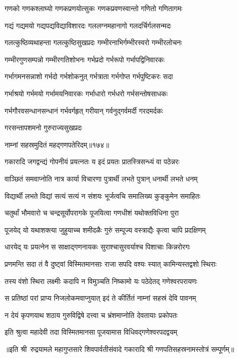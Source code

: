 \twolineshloka
{गणको गणकश्लाघ्यो गणकप्रणयोत्सुकः}%
{गणकप्रवणस्वान्तो गणितो गणितागमः}%

\twolineshloka
{गद्यं गद्यमयो गद्यपद्यविद्याविशारदः}%
{गललग्नमहानागो गलदर्चिर्गलसन्मदः}%

\twolineshloka
{गलत्कुष्ठिव्यथाहन्ता गलत्कुष्ठिसुखप्रदः}%
{गम्भीरनाभिर्गम्भीरस्वरो गम्भीरलोचनः}%

\twolineshloka
{गम्भीरगुणसम्पन्नो गम्भीरगतिशोभनः}%
{गर्भप्रदो गर्भरूपो गर्भापद्विनिवारकः}%

\twolineshloka
{गर्भागमनसन्नाशो गर्भदो गर्भशोकनुत्}%
{गर्भत्राता गर्भगोप्त गर्भपुष्टिकरः सदा}%

\twolineshloka
{गर्भाश्रयो गर्भमयो गर्भामयनिवारकः}%
{गर्भाधारो गर्भधरो गर्भसन्तोषसाधकः}%

\twolineshloka
{गर्भगौरवसन्धानसन्धानं गर्भवर्गहृत्}%
{गरीयान् गर्वनुद्गर्वमर्दी गरदमर्दकः}%

{गरसन्तापशमनो गुरुराज्यसुखप्रदः}%

{नाम्नां सहस्रमुदितं महद्गणपतेरिदम्॥१७४॥}%
\addtocounter{shlokacount}{1}

\twolineshloka
{गकारादि जगद्वन्द्यं गोपनीयं प्रयत्नतः}%
{य इदं प्रयतः प्रातस्त्रिसन्ध्यं वा पठेन्नरः}%

\twolineshloka
{वाञ्छितं समवाप्नोति नात्र कार्या विचारणा}%
{पुत्रार्थी लभते पुत्रान् धनार्थी लभते धनम्}%

\twolineshloka
{विद्यार्थी लभते विद्यां सत्यं सत्यं न संशयः}%
{भूर्जत्वचि समालिख्य कुङ्कुमेन समाहितः}%

\twolineshloka
{चतुर्थां भौमवारो च चन्द्रसूर्योपरागके}%
{पूजयित्वा गणधीशं यथोक्तविधिना पुरा}%

\twolineshloka
{पूजयेद् यो यथाशक्त्या जुहुयाच्च शमीदळैः}%
{गुरुं सम्पूज्य वस्त्राद्यैः कृत्वा चापि प्रदक्षिणम्}%

\twolineshloka
{धारयेद् यः प्रयत्नेन स साक्षाद्गणनायकः}%
{सुराश्चासुरवर्याश्च पिशाचाः किन्नरोरगः}%

\twolineshloka
{प्रणमन्ति सदा तं वै दुष्ट्वां विस्मितमानसाः}%
{राजा सपदि वश्यः स्यात् कामिन्यस्तद्वशो स्थिराः}%

\twolineshloka
{तस्य वंशो स्थिरा लक्ष्मीः कदापि न विमुञ्चति}%
{निष्कामो यः पठेदेतद् गणेश्वरपरायणः}%

\twolineshloka
{स प्रतिष्ठां परां प्राप्य निजलोकमवाप्नुयात्}%
{इदं ते कीर्तितं नाम्नां सहस्रं देवि पावनम्}%

\twolineshloka
{न देयं कृपणयाथ शठाय गुरुविद्विषे}%
{दत्त्वा च भ्रंशमाप्नोति देवतायाः प्रकोपतः}%

\twolineshloka
{इति श्रुत्वा महादेवी तदा विस्मितमानसा}%
{पूजयामास विधिवद्गणेश्वरपदद्वयम्}%

॥इति श्री~रुद्रयामले महागुप्तसारे शिवपार्वतीसंवादे गकारादि श्री गणपतिसहस्रनामस्तोत्रं सम्पूर्णम्॥
